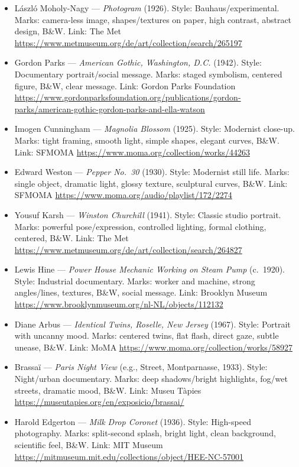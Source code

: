 \documentclass[12pt]{article}
\begin{document}
\begin{itemize}
  \item László Moholy-Nagy — \emph{Photogram} (1926). Style: Bauhaus/experimental. Marks: camera-less image, shapes/textures on paper, high contrast, abstract design, B\&W. Link: The Met \url{https://www.metmuseum.org/de/art/collection/search/265197}
  \item Gordon Parks — \emph{American Gothic, Washington, D.C.} (1942). Style: Documentary portrait/social message. Marks: staged symbolism, centered figure, B\&W, clear message. Link: Gordon Parks Foundation \url{https://www.gordonparksfoundation.org/publications/gordon-parks/american-gothic-gordon-parks-and-ella-watson}
  \item Imogen Cunningham — \emph{Magnolia Blossom} (1925). Style: Modernist close-up. Marks: tight framing, smooth light, simple shapes, elegant curves, B\&W. Link: SFMOMA \url{https://www.moma.org/collection/works/44263}
  \item Edward Weston — \emph{Pepper No.\ 30} (1930). Style: Modernist still life. Marks: single object, dramatic light, glossy texture, sculptural curves, B\&W. Link: SFMOMA \url{https://www.moma.org/audio/playlist/172/2274}
  \item Yousuf Karsh — \emph{Winston Churchill} (1941). Style: Classic studio portrait. Marks: powerful pose/expression, controlled lighting, formal clothing, centered, B\&W. Link: The Met \url{https://www.metmuseum.org/de/art/collection/search/264827}
  \item Lewis Hine — \emph{Power House Mechanic Working on Steam Pump} (c.\ 1920). Style: Industrial documentary. Marks: worker and machine, strong angles/lines, textures, B\&W, social message. Link: Brooklyn Museum \url{https://www.brooklynmuseum.org/nl-NL/objects/112132}
  \item Diane Arbus — \emph{Identical Twins, Roselle, New Jersey} (1967). Style: Portrait with uncanny mood. Marks: centered twins, flat flash, direct gaze, subtle unease, B\&W. Link: MoMA \url{https://www.moma.org/collection/works/58927}
  \item Brassaï — \emph{Paris Night View} (e.g., Street, Montparnasse, 1933). Style: Night/urban documentary. Marks: deep shadows/bright highlights, fog/wet streets, dramatic mood, B\&W. Link: Museu Tàpies \url{https://museutapies.org/en/exposicio/brassai/}
  \item Harold Edgerton — \emph{Milk Drop Coronet} (1936). Style: High-speed photography. Marks: split-second splash, bright light, clean background, scientific feel, B\&W. Link: MIT Museum \url{https://mitmuseum.mit.edu/collections/object/HEE-NC-57001}

\end{itemize}
\end{document}
